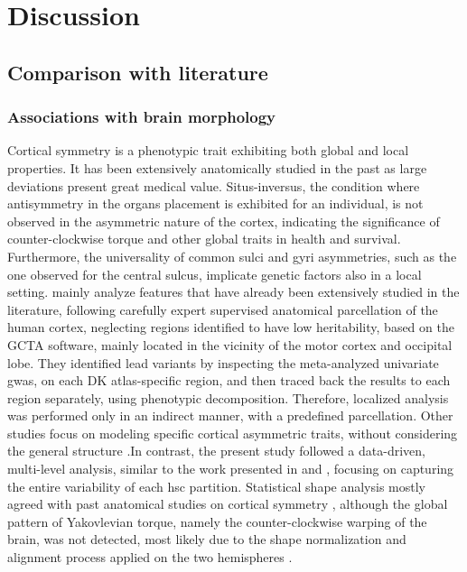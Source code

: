 \chapter{Discussion}\label{chap:discussion}

\section{Comparison with literature}
\subsection{Associations with brain morphology}
\label{sec:lit_discussion}
Cortical symmetry is a phenotypic trait exhibiting both global and local properties. It has been extensively anatomically studied in the past as large deviations present great medical value. Situs-inversus, the condition where antisymmetry in the organs placement is exhibited for an individual, is not observed in the asymmetric nature of the cortex, indicating the significance of counter-clockwise torque and other global traits in health and survival.  Furthermore, the universality of common sulci and gyri asymmetries, such as the one observed for the central sulcus, implicate genetic factors also in a local setting.  \citet{Sha2021} mainly analyze features that have already been extensively studied in the literature, following carefully expert supervised anatomical parcellation of the human cortex, neglecting regions identified to have low heritability, based on the GCTA software, mainly located in the vicinity of the motor cortex and occipital lobe. They identified lead variants by inspecting the meta-analyzed univariate \ac{gwas}, on each DK atlas-specific region, and then traced back the results to each region separately, using phenotypic decomposition\cite{Lin2020}. Therefore, localized analysis was performed only in an indirect manner, with a predefined parcellation. Other studies focus on modeling specific cortical asymmetric traits, without considering the general structure \cite{Kong2018,Kong2021,Zhao2022}.In contrast, the present study followed a data-driven, multi-level analysis, similar to the work presented in \cite{Naqvi2021} and \cite{Claes2018}, focusing on capturing the entire variability of each  \ac{hsc} partition. Statistical shape analysis mostly agreed with past anatomical studies on cortical symmetry \cite{Toga2003}, although the global pattern of Yakovlevian torque, namely the counter-clockwise warping of the brain, was not detected, most likely due to the shape normalization and alignment process applied on the two hemispheres \cite{Vanbiervliet2022}.

